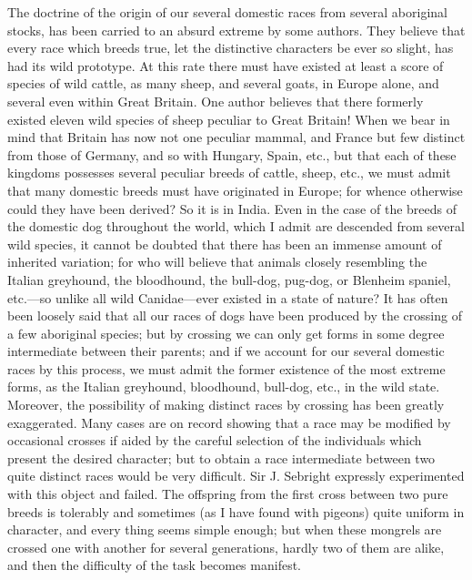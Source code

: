 The doctrine of the origin of our several domestic races from
several aboriginal stocks, has been carried to an absurd extreme by
some authors. They believe that every race which breeds true, let
the distinctive characters be ever so slight, has had its wild
prototype. At this rate there must have existed at least a score of
species of wild cattle, as many sheep, and several goats, in Europe
alone, and several even within Great Britain. One author believes
that there formerly existed eleven wild species of sheep peculiar
to Great Britain! When we bear in mind that Britain has now not one
peculiar mammal, and France but few distinct from those of Germany,
and so with Hungary, Spain, etc., but that each of these kingdoms
possesses several peculiar breeds of cattle, sheep, etc., we must
admit that many domestic breeds must have originated in Europe; for
whence otherwise could they have been derived? So it is in India.
Even in the case of the breeds of the domestic dog throughout the
world, which I admit are descended from several wild species, it
cannot be doubted that there has been an immense amount of
inherited variation; for who will believe that animals closely
resembling the Italian greyhound, the bloodhound, the bull-dog,
pug-dog, or Blenheim spaniel, etc.—so unlike all wild Canidae—ever
existed in a state of nature? It has often been loosely said that
all our races of dogs have been produced by the crossing of a few
aboriginal species; but by crossing we can only get forms in some
degree intermediate between their parents; and if we account for
our several domestic races by this process, we must admit the
former existence of the most extreme forms, as the Italian
greyhound, bloodhound, bull-dog, etc., in the wild state. Moreover,
the possibility of making distinct races by crossing has been
greatly exaggerated. Many cases are on record showing that a race
may be modified by occasional crosses if aided by the careful
selection of the individuals which present the desired character;
but to obtain a race intermediate between two quite distinct races
would be very difficult. Sir J. Sebright expressly experimented
with this object and failed. The offspring from the first cross
between two pure breeds is tolerably and sometimes (as I have found
with pigeons) quite uniform in character, and every thing seems
simple enough; but when these mongrels are crossed one with another
for several generations, hardly two of them are alike, and then the
difficulty of the task becomes manifest.